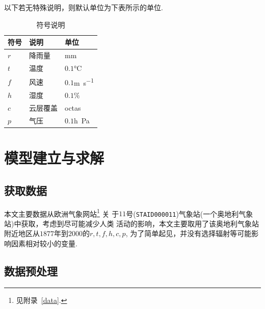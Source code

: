 \documentclass[UTF8, a4paper]{ctexart}
\begin{document}
以下若无特殊说明，则默认单位为下表所示的单位.

\begin{table}[h!]
	\centering
	\caption{符号说明}
	\begin{tabular}{p{6em}p{6em}l}
		\hline
		符号  & 说明   & 单位                          \\
		\hline
		$r$ & 降雨量  & \si{\milli\meter}           \\
		$t$ & 温度   & $0.1$\si{\degreeCelsius}    \\
		$f$ & 风速   & $0.1$\si{\meter\per\second} \\
		$h$ & 湿度   & $0.1\%$                     \\
		$c$ & 云层覆盖 & \si{octas}                  \\
		$p$ & 气压   & $0.1$\si{h\pascal}          \\
		\hline
	\end{tabular}
\end{table}

\section{模型建立与求解}

\subsection{获取数据}

本文主要数据从欧洲气象网站\footnote{见附录~\textcolor{red}{\ref{data}}.} 关
于$11$号(\verb+STAID000011+)气象站(一个奥地利气象站)中获取，考虑到尽可能减少人类
活动的影响，本文主要取用了该奥地利气象站附近地区从$1877$年到$2000$的$r,t,f,h,c,p$,
为了简单起见，并没有选择辐射等可能影响因素相对较小的变量.


\subsection{数据预处理}
\end{document}
